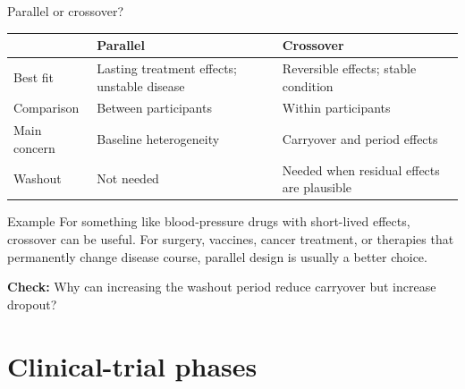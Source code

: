 \documentclass[aspectratio=169,11pt]{beamer}
\begin{document}
\begin{frame}{Parallel or crossover?}
  \small
  \begin{tabular}{>{\raggedright\arraybackslash}p{}
                  >{\raggedright\arraybackslash}p{}
                  >{\raggedright\arraybackslash}p{}}
    \toprule
    & \textbf{Parallel} & \textbf{Crossover} \\
    \midrule
    Best fit & Lasting treatment effects; unstable disease & Reversible effects; stable condition \\
    Comparison & Between participants & Within participants \\
    Main concern & Baseline heterogeneity & Carryover and period effects \\
    Washout & Not needed & Needed when residual effects are plausible \\
    \bottomrule
  \end{tabular}

  \vspace{0.7em}
  \begin{exampleblock}{Example}
    For something like blood-pressure drugs with short-lived effects, crossover can be useful.
    For surgery, vaccines, cancer treatment, or therapies that permanently change disease course,
    parallel design is usually a better choice.
  \end{exampleblock}

  \textbf{Check:} Why can increasing the washout period reduce carryover but increase dropout?
\end{frame}

\section{Clinical-trial phases}
\end{document}
